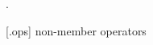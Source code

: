 \indexlibrary{\idxcode{}!\idxcode{}}
\indexlibrary{\idxcode{}!\idxcode{}}
\begin{itemdecl}
\end{itemdecl}
\begin{itemdescr}
	\pnum
	\effects
	
	\pnum
	\returns
	.
\end{itemdescr}

 [.ops] {\tcode{} non-member operators}

\indexlibrary{\idxcode{}!\idxcode{}}
\indexlibrary{\idxcode{}!\idxcode{}}
\begin{itemdecl}
\end{itemdecl}
\begin{itemdescr}
	\pnum
	\returns
\end{itemdescr}

